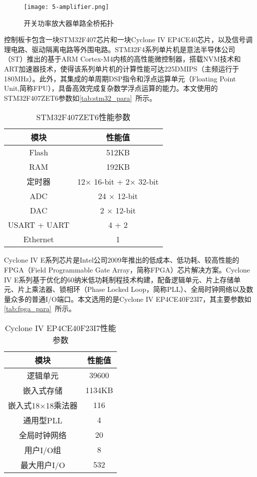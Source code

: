 \documentclass[
  lang=cn,
  degree=master,
  openany,oneside
]{nuaathesis}
\begin{document}
\begin{figure}[h!]
	\texttt{[image: 5-amplifier.png]}
	\caption{开关功率放大器单路全桥拓扑}
	\label{fig:5-amplifier}
\end{figure}

控制板卡包含一块STM32F407芯片和一块Cyclone IV EP4CE40芯片，以及信号调理电路、驱动隔离电路等外围电路。STM32F4系列单片机是意法半导体公司（ST）推出的基于ARM Cortex-M4内核的高性能微控制器，搭载NVM技术和ART加速器技术，使得该系列单片机的计算性能可达225DMIPS（主频运行于180MHz）。此外，其集成的单周期DSP指令和浮点运算单元（Floating Point Unit,简称FPU），具备高效完成复杂数学浮点运算的能力。本文使用的STM32F407ZET6参数如\autoref{tab:stm32_para}~所示。

\begin{table}[h!]
  \caption[STM32F407ZET6性能参数]{STM32F407ZET6性能参数\label{tab:stm32_para}}
  \begin{tabular}{cc}
    \toprule
    模块 & 性能值 \\
    \midrule
    Flash & 512KB\\
    RAM & 192KB\\
    定时器 & 12$\times$ 16-bit + 2$\times$ 32-bit\\
    ADC & 24 $\times$ 12-bit\\
    DAC & 2 $\times$ 12-bit\\
    USART + UART & 4 + 2\\
    Ethernet & 1	\\
    \bottomrule
  \end{tabular}
\end{table}

Cyclone IV E系列芯片是Intel公司2009年推出的低成本、低功耗、较高性能的FPGA（Field Programmable Gate Array，简称FPGA）芯片解决方案。Cyclone IV E系列基于优化的60纳米低功耗制程技术构建，配备逻辑单元、片上存储单元、片上乘法器、锁相环（Phase Locked Loop，简称PLL）、全局时钟网络以及数量众多的普通I/O端口。本文选用的是Cyclone IV EP4CE40F23I7，其主要参数如\autoref{tab:fpga_para}~所示。

\begin{table}[h!]
  \caption[Cyclone IV EP4CE40F23I7性能参数]{Cyclone IV EP4CE40F23I7性能参数\label{tab:fpga_para}}
  \begin{tabular}{cc}
    \toprule
    模块 & 性能值 \\
    \midrule
    逻辑单元 & 39600\\
    嵌入式存储 & 1134KB\\
    嵌入式18$\times$18乘法器 & 116\\
    通用型PLL & 4\\
    全局时钟网络 & 20\\
    用户I/O组 & 8\\
    最大用户I/O & 532	\\
    \bottomrule
  \end{tabular}
\end{table}
\end{document}
